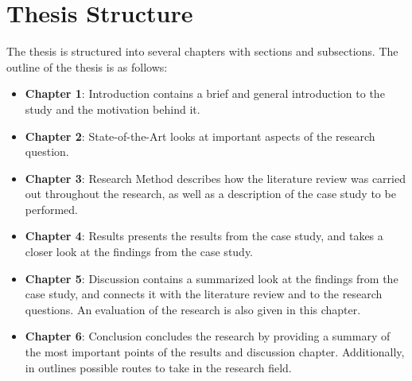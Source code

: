 \section{Thesis Structure}
The thesis is structured into several chapters with sections and subsections. The outline of the thesis is as follows:
\begin{itemize}
	\item{\textbf{Chapter 1}}: Introduction contains a brief and general introduction to the study and the motivation behind it.
	\item{\textbf{Chapter 2}}: State-of-the-Art looks at important aspects of the research question.
	\item{\textbf{Chapter 3}}: Research Method describes how the literature review was carried out throughout the research, as well as a description of the case study to be performed.
	\item{\textbf{Chapter 4}}: Results presents the results from the case study, and takes a closer look at the findings from the case study.
	\item{\textbf{Chapter 5}}: Discussion contains a summarized look at the findings from the case study, and connects it with the literature review and to the research questions. An evaluation of the research is also given in this chapter.
	\item{\textbf{Chapter 6}}: Conclusion concludes the research by providing a summary of the most important points of the results and discussion chapter. Additionally, in outlines possible routes to take in the research field.
\end{itemize}

